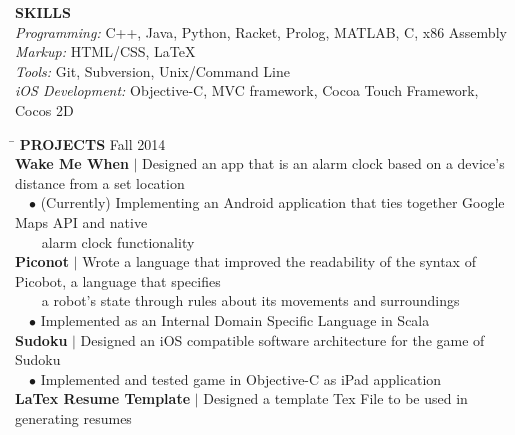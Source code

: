 \documentclass[11pt]{article}
\newcommand{\vb}{ $\mid$ }
\newcommand{\sectionNL}{\\[-2pt]}
\newcommand{\customtab}{$\hspace{10pt} \bullet \hspace{2pt}$}
\newcommand{\customtabinline}{$\hspace{23pt}$}
\begin{document}
\begin{flushleft}
{\textbf{SKILLS}} \sectionNL
\textit{Programming:} C++, Java, Python, Racket, Prolog, MATLAB, C, x86 Assembly\\
\textit{Markup:} HTML/CSS, LaTeX \\
\textit{Tools:} Git, Subversion, Unix/Command Line \\
\textit{iOS Development:} Objective-C, MVC framework, Cocoa Touch Framework, Cocos 2D %
\end{flushleft}

\begin{tabbing} 
\hspace*{6.5in}\= \kill
{\textbf{PROJECTS} } \> Fall 2014 \sectionNL

\textbf{Wake Me When} \vb Designed an app that is an alarm clock based on a device's distance from a set location \\
\customtab (Currently) Implementing an Android application that ties together Google Maps API and native \\ 
\customtabinline alarm clock functionality \\

\textbf{Piconot} \vb  Wrote a language that improved the readability of the syntax of Picobot, a language that specifies  \\
\customtabinline a robot's state through rules about its movements and surroundings \\
\customtab Implemented as an Internal Domain Specific Language in Scala \\
 
\textbf{Sudoku} \vb Designed an iOS compatible software architecture for the game of Sudoku \\
\customtab Implemented and tested game in Objective-C as iPad application \\

\textbf{LaTex Resume Template} \vb Designed a template Tex File to be used in generating resumes


\end{tabbing} 
\end{document}
